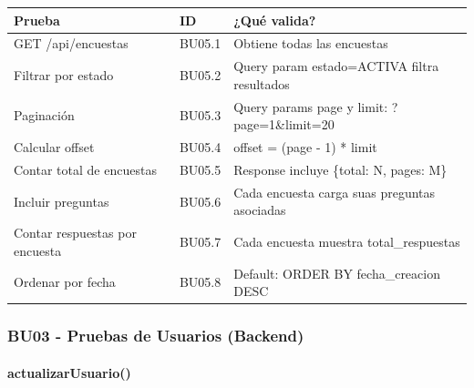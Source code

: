 \begin{table}[H]
\centering
\begin{tabular}{|l|l|p{6cm}|}
\hline
\textbf{Prueba} & \textbf{ID} & \textbf{¿Qué valida?} \\ \hline
GET /api/encuestas & BU05.1 & Obtiene todas las encuestas \\ \hline
Filtrar por estado & BU05.2 & Query param \?estado=ACTIVA filtra resultados \\ \hline
Paginación & BU05.3 & Query params page y limit: ?page=1\&limit=20 \\ \hline
Calcular offset & BU05.4 & offset = (page - 1) * limit \\ \hline
Contar total de encuestas & BU05.5 & Response incluye \{total: N, pages: M\} \\ \hline
Incluir preguntas & BU05.6 & Cada encuesta carga suas preguntas asociadas \\ \hline
Contar respuestas por encuesta & BU05.7 & Cada encuesta muestra total\_respuestas \\ \hline
Ordenar por fecha & BU05.8 & Default: ORDER BY fecha\_creacion DESC \\ \hline
\end{tabular}
\end{table}

\subsubsection{BU03 - Pruebas de Usuarios (Backend)}

\paragraph{actualizarUsuario()}

